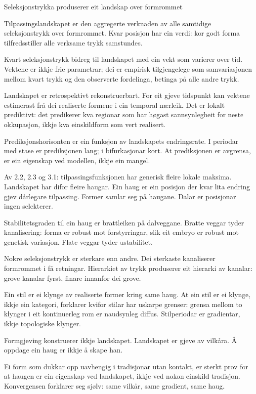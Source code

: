 \documentclass[10pt,oneside]{book}
\newlength{\propnumwidth}
\newlength{\propnumgap}
\newcommand{\prop}[3]{%
  \par\addvspace{6pt}%
  \noindent\llap{\makebox[\propnumwidth][l]{\textbf{#1}\textsuperscript{\textit{#2}}}\hspace{\propnumgap}}%
  #3\par%
  \addvspace{2pt}%
}
\begin{document}
\prop{3}{}{Seleksjonstrykka produserer eit landskap over formrommet}
\prop{3.1}{d}{Tilpassingslandskapet er den aggregerte verknaden av alle samtidige seleksjonstrykk over formrommet. Kvar posisjon har ein verdi: kor godt forma tilfredsstiller alle verksame trykk samstundes.}
\prop{3.11}{o}{Kvart seleksjonstrykk bidreg til landskapet med ein vekt som varierer over tid. Vektene er ikkje frie parametrar; dei er empirisk tilgjengelege som samvariasjonen mellom kvart trykk og den observerte fordelinga, betinga på alle andre trykk.}
\prop{3.12}{o}{Landskapet er retrospektivt rekonstruerbart. For eit gjeve tidspunkt kan vektene estimerast frå dei realiserte formene i ein temporal nærleik. Det er lokalt prediktivt: det predikerer kva regionar som har høgast sannsynlegheit for neste okkupasjon, ikkje kva einskildform som vert realisert.}
\prop{3.13}{o}{Prediksjonshorisonten er ein funksjon av landskapets endringsrate. I periodar med stase er prediksjonen lang; i bifurkasjonar kort. At prediksjonen er avgrensa, er ein eigenskap ved modellen, ikkje ein mangel.}
\prop{3.2}{t}{Av 2.2, 2.3 og 3.1: tilpassingsfunksjonen har generisk fleire lokale maksima. Landskapet har difor fleire haugar. Ein haug er ein posisjon der kvar lita endring gjev dårlegare tilpassing. Former samlar seg på haugane. Dalar er posisjonar ingen selekterer.}
\prop{3.3}{d}{Stabilitetsgraden til ein haug er brattleiken på dalveggane. Bratte veggar tyder kanalisering: forma er robust mot forstyrringar, slik eit embryo er robust mot genetisk variasjon. Flate veggar tyder ustabilitet.}
\prop{3.31}{t}{Nokre seleksjonstrykk er sterkare enn andre. Dei sterkaste kanaliserer formrommet i få retningar. Hierarkiet av trykk produserer eit hierarki av kanalar: grove kanalar fyrst, finare innanfor dei grove.}
\prop{3.4}{d}{Ein stil er ei klynge av realiserte former kring same haug. At ein stil er ei klynge, ikkje ein kategori, forklarer kvifor stilar har uskarpe grenser: grensa mellom to klynger i eit kontinuerleg rom er naudsynleg diffus. Stilperiodar er gradientar, ikkje topologiske klynger.}
\prop{3.5}{t}{Formgjeving konstruerer ikkje landskapet. Landskapet er gjeve av vilkåra. Å oppdage ein haug er ikkje å skape han.}
\prop{3.6}{t}{Ei form som dukkar opp uavhengig i tradisjonar utan kontakt, er sterkt prov for at haugen er ein eigenskap ved landskapet, ikkje ved nokon einskild tradisjon. Konvergensen forklarer seg sjølv: same vilkår, same gradient, same haug.}
\clearpage
{}
\end{document}
